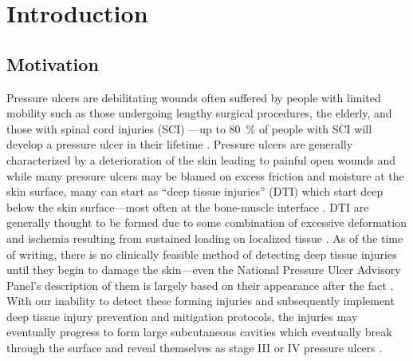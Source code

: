 \chapter{Introduction}
	\section{Motivation}
		Pressure ulcers are debilitating wounds often suffered by people with limited mobility such as those undergoing lengthy surgical procedures, the elderly, and those with spinal cord injuries (SCI) \cite{allman95}---up to \SI{80}{\percent} of people with SCI will develop a pressure ulcer in their lifetime \cite{salzberg96}. Pressure ulcers are generally characterized by a deterioration of the skin leading to painful open wounds and while many pressure ulcers may be blamed on excess friction and moisture at the skin surface, many can start as ``deep tissue injuries'' (DTI) which start deep below the skin surface---most often at the bone-muscle interface \cite{kanno09}. DTI are generally thought to be formed due to some combination of excessive deformation and ischemia resulting from sustained loading on localized tissue \cite{stekelenburg08, gefen05, loerakker11}. As of the time of writing, there is no clinically feasible method of detecting deep tissue injuries until they begin to damage the skin---even the National Pressure Ulcer Advisory Panel's description of them is largely based on their appearance after the fact \cite{npuap07}. With our inability to detect these forming injuries and subsequently implement deep tissue injury prevention and mitigation protocols, the injuries may eventually progress to form large subcutaneous cavities which eventually break through the surface and reveal themselves as stage III or IV pressure ulcers \cite{bouten03,oomens10}.

